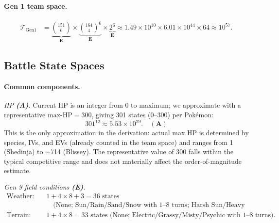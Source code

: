 \paragraph{Gen 1 team space.}
\begin{align}
    \mathcal{T}_{\text{Gen1}}
    &= \underbrace{\binom{151}{6}}_{\mathbf{E}} \times
       \underbrace{\binom{164}{4}^6}_{\mathbf{E}} \times
       \underbrace{2^{6}}_{\mathbf{E}}
    \approx 1.49 \times 10^{10}
       \times 6.01 \times 10^{44}
       \times 64
    \approx \boxed{10^{57}}.
    \label{eq:gen1-total}
\end{align}

\subsection{Battle State Spaces}
\label{sec:battle-state}

\paragraph{Common components.}

\emph{HP \textbf{(A)}.}
Current HP is an integer from 0 to maximum; we approximate with a representative $\text{max-HP} = 300$, giving 301 states (0--300) per Pok\'emon:
\begin{equation}
    301^{12} \approx 5.53 \times 10^{29}. \quad \mathbf{(A)}
\end{equation}
This is the only approximation in the derivation: actual max HP is determined by species, IVs, and EVs (already counted in the team space) and ranges from 1 (Shedinja) to $\sim$714 (Blissey). The representative value of 300 falls within the typical competitive range and does not materially affect the order-of-magnitude estimate.

\emph{Gen 9 field conditions \textbf{(E)}.}
\begin{align*}
    \text{Weather:} &\quad 1 + 4 \times 8 + 3 = 36 \text{ states} \\
                    &\qquad \text{(None; Sun/Rain/Sand/Snow with 1--8 turns; Harsh Sun/Heavy Rain/Strong Winds).} \\
    \text{Terrain:} &\quad 1 + 4 \times 8 = 33 \text{ states (None; Electric/Grassy/Misty/Psychic with 1--8 turns).}
\end{align*}

